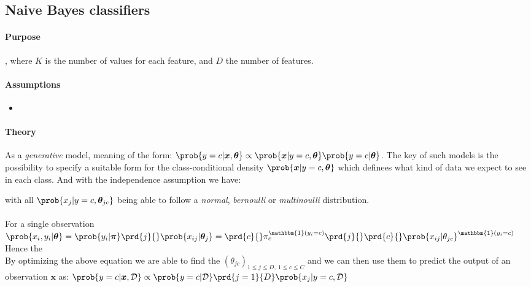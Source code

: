 \subsection{Naive Bayes classifiers}
\paragraph{Purpose}
, where $K$ is the number of values for
each feature, and $D$ the number of features.

\paragraph{Assumptions}
\begin{itemize}
    \item {}
\end{itemize}

\paragraph{Theory}
As a \emph{generative} model, meaning of the form:
$\prob{y=c|\bm{x}, \bm{\theta}} \propto \prob{\bm{x}|y=c,\bm{\theta}}
\prob{y=c|\bm{\theta}}$. The key of such models is the possibility
to specify a suitable form for the class-conditional density 
$\prob{\bm{x}|y=c, \bm{\theta}}$ which definees what kind of data we 
expect to see in each class. And with the independence assumption we 
have:
\begin{center}
\end{center}
with all $\prob{x_{j}|y=c,\bm{\theta}_{jc}}$ being able to 
follow a \textit{normal}, \textit{bernoulli} or \textit{multinoulli} 
distribution.\\
\\
For a single observation
$\prob{x_{i}, y_{i}|\bm{\theta}} = \prob{y_{i}|\bm{\pi}}\prd{j}{}\prob{x_{ij}|\bm{\theta}_{j}} = 
\prd{c}{}\pi_{c}^{\mathbbm{1}(y_{i}=c)}\prd{j}{}\prd{c}{}\prob{x_{ij}|
\theta_{jc}}^{\mathbbm{1}(y_{i}=c)}
$\\ 
Hence the \\
By optimizing the above equation we are able to find the $\left(\theta_{jc}\right)_{1\leq j \leq D,~ 1\leq c\leq C}$ and we can then use them to
predict the output of an observation $\bm{x}$ as: $\prob{y=c|\bm{x},\mathcal{D}} \propto \prob{y=c|\mathcal{D}}\prd{j=1}{D}\prob{x_{j}|y=c,\mathcal{D}}$

